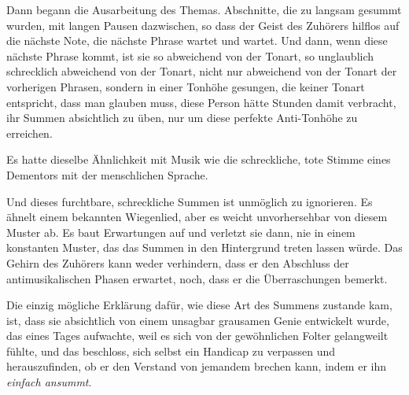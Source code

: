Dann begann die Ausarbeitung des Themas. Abschnitte, die zu langsam gesummt wurden, mit langen Pausen dazwischen, so dass der Geist des Zuhörers hilflos auf die nächste Note, die nächste Phrase wartet und wartet. Und dann, wenn diese nächste Phrase kommt, ist sie so abweichend von der Tonart, so unglaublich schrecklich abweichend von der Tonart, nicht nur abweichend von der Tonart der vorherigen Phrasen, sondern in einer Tonhöhe gesungen, die keiner Tonart entspricht, dass man glauben muss, diese Person hätte Stunden damit verbracht, ihr Summen absichtlich zu üben, nur um diese perfekte Anti-Tonhöhe zu erreichen.

Es hatte dieselbe Ähnlichkeit mit Musik wie die schreckliche, tote Stimme eines Dementors mit der menschlichen Sprache.

Und dieses furchtbare, schreckliche Summen ist unmöglich zu ignorieren. Es ähnelt einem bekannten Wiegenlied, aber es weicht unvorhersehbar von diesem Muster ab. Es baut Erwartungen auf und verletzt sie dann, nie in einem konstanten Muster, das das Summen in den Hintergrund treten lassen würde. Das Gehirn des Zuhörers kann weder verhindern, dass er den Abschluss der antimusikalischen Phasen erwartet, noch, dass er die Überraschungen bemerkt.

Die einzig mögliche Erklärung dafür, wie diese Art des Summens zustande kam, ist, dass sie absichtlich von einem unsagbar grausamen Genie entwickelt wurde, das eines Tages aufwachte, weil es sich von der gewöhnlichen Folter gelangweilt fühlte, und das beschloss, sich selbst ein Handicap zu verpassen und herauszufinden, ob er den Verstand von jemandem brechen kann, indem er ihn \emph{einfach ansummt}.

